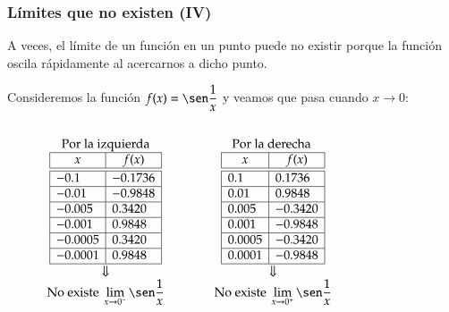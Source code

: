 \begin{frame}
\frametitle{Límites que no existen (IV)}
A veces, el límite de un función en un punto puede no existir porque la función oscila rápidamente al acercarnos a dicho punto.

 Consideremos la función $f(x)=\sen \dfrac{1}{x}$ y veamos que pasa cuando $x\rightarrow 0$:
\begin{columns}
\begin{column}{0.6\textwidth}
\footnotesize
\[
\begin{array}{ccc}
\textrm{Por la izquierda} & \qquad & \textrm{Por la derecha }\\
\begin{array}{|l|l|}
\hline
\multicolumn{1}{|c|}{x}      & \multicolumn{1}{c|}{f(x)}   \\
\hline\hline
 -0.1   & -0.1736       \\
\hline
 -0.01   & -0.9848     \\
\hline
-0.005 & 0.3420 \\
\hline
 -0.001  & 0.9848  \\
\hline
-0.0005  & 0.3420\\
\hline
-0.0001 & 0.9848 \\
\hline
\end{array}
& &
\begin{array}{|l|l|}
\hline
\multicolumn{1}{|c|}{x}      & \multicolumn{1}{c|}{f(x)}   \\
\hline\hline
 0.1   & 0.1736       \\
\hline
 0.01   & 0.9848     \\
\hline
0.005 & -0.3420 \\
\hline
 0.001  & -0.9848  \\
\hline
0.0005  & -0.3420\\
\hline
0.0001 & -0.9848 \\
\hline
\end{array}\\
\Downarrow & & \Downarrow\\
\displaystyle \textrm{No existe }\lim_{x\rightarrow 0^-}\sen \frac{1}{x}
& &
\displaystyle \textrm{No existe }\lim_{x\rightarrow 0^+}\sen \frac{1}{x}
\end{array}
\]
\end{column}
\begin{column}{0.4\textwidth}
\begin{center}
\scalebox{1}{}
\end{center}
\end{column}
\end{columns}
\end{frame}


